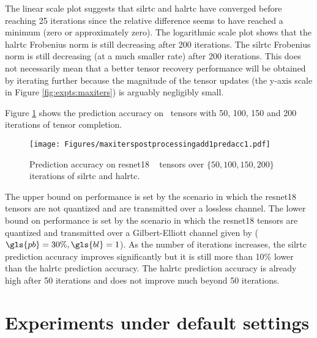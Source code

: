 The linear scale plot suggests that \gls{silrtc} and \gls{halrtc} have converged before reaching 25 iterations since the relative difference seems to have reached a minimum (zero or approximately zero). The logarithmic scale plot shows that the \gls{halrtc} Frobenius norm is still decreasing after 200 iterations. The \gls{silrtc} Frobenius norm is still decreasing (at a much smaller rate) after 200 iterations. This does not necessarily mean that a better tensor recovery performance will be obtained by iterating further because the magnitude of the tensor updates (the y-axis scale in Figure \ref{fig:expts:maxiters}) is arguably negligibly small.


Figure \ref{fig:expts:maxiters:pred} shows the prediction accuracy on \addone~tensors with 50, 100, 150 and 200 iterations of tensor completion.

\begin{figure}[H]
	\centering
	\texttt{[image: Figures/maxiterspostprocessingadd1predacc1.pdf]}
	\caption[Prediction accuracy on ResNet18 tensors over a range of iterations of tensor completion.]{Prediction accuracy on \gls{resnet18} \addone~ tensors over $\{50,100,150,200\}$ iterations of \gls{silrtc} and \gls{halrtc}.} \label{fig:expts:maxiters:pred}
\end{figure}

The upper bound on performance is set by the scenario in which the \gls{resnet18} tensors are not quantized and are transmitted over a lossless channel. The lower bound on performance is set by the scenario in which the \gls{resnet18} tensors are quantized and transmitted over a Gilbert-Elliott channel given by ($\gls{pb}=30\%,\gls{bl}=1$). As the number of iterations increases, the \gls{silrtc} prediction accuracy improves significantly but it is still more than 10\% lower than the \gls{halrtc} prediction accuracy. The \gls{halrtc} prediction accuracy is already high after 50 iterations and does not improve much beyond 50 iterations.

\section{Experiments under default settings} \label{sec:expts:default}

